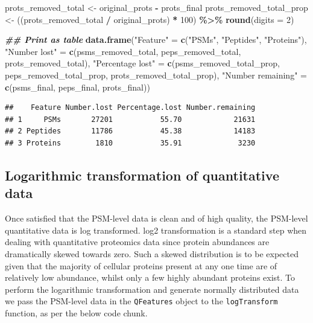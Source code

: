 \documentclass[9pt,a4paper,]{extarticle}
\newenvironment{Shaded}{\begin{snugshade}}{\end{snugshade}}
\newcommand{\AttributeTok}[1]{\textcolor[rgb]{0.13,0.29,0.53}{#1}}
\newcommand{\DecValTok}[1]{\textcolor[rgb]{0.00,0.00,0.81}{#1}}
\newcommand{\DocumentationTok}[1]{\textcolor[rgb]{0.56,0.35,0.01}{\textbf{\textit{#1}}}}
\newcommand{\FunctionTok}[1]{\textcolor[rgb]{0.13,0.29,0.53}{\textbf{#1}}}
\newcommand{\NormalTok}[1]{#1}
\newcommand{\OtherTok}[1]{\textcolor[rgb]{0.56,0.35,0.01}{#1}}
\newcommand{\SpecialCharTok}[1]{\textcolor[rgb]{0.81,0.36,0.00}{\textbf{#1}}}
\newcommand{\StringTok}[1]{\textcolor[rgb]{0.31,0.60,0.02}{#1}}
\begin{document}
\begin{Shaded}
\begin{Highlighting}[]
\NormalTok{prots\_removed\_total }\OtherTok{\textless{}{-}}\NormalTok{ original\_prots }\SpecialCharTok{{-}}\NormalTok{ prots\_final}
\NormalTok{prots\_removed\_total\_prop }\OtherTok{\textless{}{-}}\NormalTok{ ((prots\_removed\_total }\SpecialCharTok{/}\NormalTok{ original\_prots) }\SpecialCharTok{*} \DecValTok{100}\NormalTok{) }\SpecialCharTok{\%\textgreater{}\%}
  \FunctionTok{round}\NormalTok{(}\AttributeTok{digits =} \DecValTok{2}\NormalTok{)}

\DocumentationTok{\#\# Print as table}
\FunctionTok{data.frame}\NormalTok{(}\StringTok{"Feature"} \OtherTok{=} \FunctionTok{c}\NormalTok{(}\StringTok{"PSMs"}\NormalTok{,}
                         \StringTok{"Peptides"}\NormalTok{,}
                         \StringTok{"Proteins"}\NormalTok{),}
           \StringTok{"Number lost"} \OtherTok{=} \FunctionTok{c}\NormalTok{(psms\_removed\_total,}
\NormalTok{                             peps\_removed\_total,}
\NormalTok{                             prots\_removed\_total),}
           \StringTok{"Percentage lost"} \OtherTok{=} \FunctionTok{c}\NormalTok{(psms\_removed\_total\_prop,}
\NormalTok{                                 peps\_removed\_total\_prop,}
\NormalTok{                                 prots\_removed\_total\_prop),}
           \StringTok{"Number remaining"} \OtherTok{=} \FunctionTok{c}\NormalTok{(psms\_final,}
\NormalTok{                                  peps\_final,}
\NormalTok{                                  prots\_final))}
\end{Highlighting}
\end{Shaded}

\begin{verbatim}
##    Feature Number.lost Percentage.lost Number.remaining
## 1     PSMs       27201           55.70            21631
## 2 Peptides       11786           45.38            14183
## 3 Proteins        1810           35.91             3230
\end{verbatim}

\subsection{Logarithmic transformation of quantitative data}\label{logarithmic-transformation-of-quantitative-data}

Once satisfied that the PSM-level data is clean and of high quality, the PSM-level
quantitative data is log transformed. log2 transformation is a standard
step when dealing with quantitative proteomics data since protein abundances are
dramatically skewed towards zero. Such a skewed distribution is to be expected
given that the majority of cellular proteins present at any one time are of
relatively low abundance, whilst only a few highly abundant proteins exist. To
perform the logarithmic transformation and generate normally distributed data we
pass the PSM-level data in the \texttt{QFeatures} object to the \texttt{logTransform}
function, as per the below code chunk.
\end{document}
